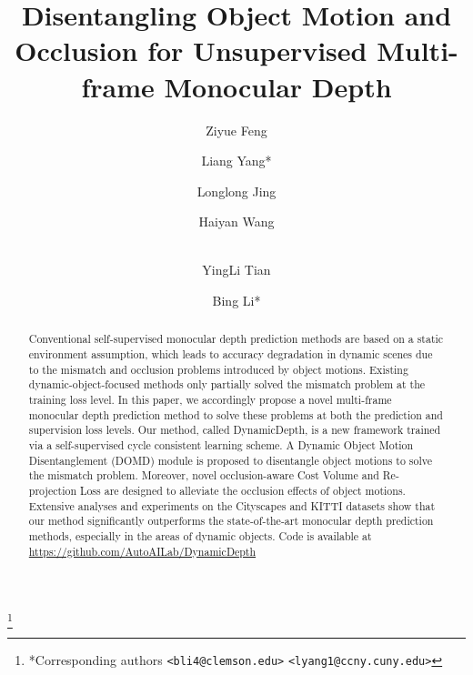 \documentclass[runningheads]{llncs}
\newcommand\nnfootnote[1]{\begin{NoHyper}
  \renewcommand\thefootnote{}\footnote{#1}\addtocounter{footnote}{-1}\end{NoHyper}
}
\begin{document}
\title{Disentangling Object Motion and Occlusion for Unsupervised Multi-frame Monocular Depth}





\begin{comment}
\titlerunning{} 
\authorrunning{ECCV-22 submission ID \ECCVSubNumber} 
\author{Anonymous ECCV submission}
\institute{Paper ID \ECCVSubNumber}
\end{comment}


\author{Ziyue Feng \and
Liang Yang* \and
Longlong Jing \and
Haiyan Wang \and \\
YingLi Tian \and
Bing Li*}
\maketitle

\nnfootnote{*Corresponding authors \texttt{<bli4@clemson.edu>} \texttt{<lyang1@ccny.cuny.edu>}}
\begin{abstract}


Conventional self-supervised monocular depth prediction methods are based on a static environment assumption, which leads to accuracy degradation in dynamic scenes due to the mismatch and occlusion problems introduced by object motions. Existing dynamic-object-focused methods only partially solved the mismatch problem at the training loss level. In this paper, we accordingly propose a novel multi-frame monocular depth prediction method to solve these problems at both the prediction and supervision loss levels. Our method, called DynamicDepth, is a new framework trained via a self-supervised cycle consistent learning scheme. A Dynamic Object Motion Disentanglement (DOMD) module is proposed to disentangle object motions to solve the mismatch problem. Moreover, novel occlusion-aware Cost Volume and Re-projection Loss are designed to alleviate the occlusion effects of object motions. Extensive analyses and experiments on the Cityscapes and KITTI datasets show that our method significantly outperforms the state-of-the-art monocular depth prediction methods, especially in the areas of dynamic objects. Code is available at \url{https://github.com/AutoAILab/DynamicDepth}

\end{abstract}
\end{document}
